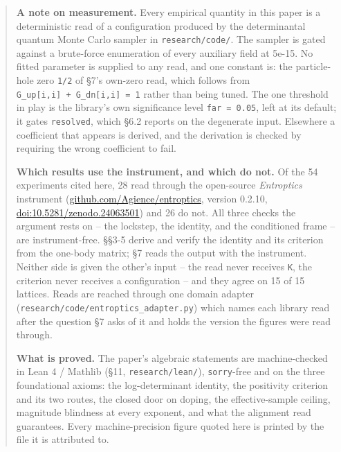 \documentclass[10pt,letterpaper,twocolumn]{article}
\begin{document}
\begin{quote}
\textbf{A note on measurement.} Every empirical quantity in this paper is a deterministic read of a
configuration produced by the determinantal quantum Monte Carlo sampler in \texttt{research/\allowbreak{}code/\allowbreak{}}. The
sampler is gated against a brute-force enumeration of every auxiliary field at 5e-15. No
fitted parameter is supplied to any read, and one constant is: the particle-hole zero \texttt{1/\allowbreak{}2} of
§7's own-zero read, which follows from \texttt{G\_\allowbreak{}up[\allowbreak{}i,\allowbreak{}i]\allowbreak{}\ +\allowbreak{}\ G\_\allowbreak{}dn[\allowbreak{}i,\allowbreak{}i]\allowbreak{}\ =\allowbreak{}\ 1} rather than being tuned. The
one threshold in play is the library's own significance level \texttt{far\ =\allowbreak{}\ 0.\allowbreak{}05}, left at its default;
it gates \texttt{resolved}, which §6.2 reports on the degenerate input. Elsewhere a coefficient
that appears is derived, and the derivation is checked by requiring the wrong coefficient to fail.

\textbf{Which results use the instrument, and which do not.} Of the 54 experiments cited here, 28 read
through the open-source \emph{Entroptics} instrument
(\href{https://github.com/Agience/entroptics}{github.\allowbreak{}com/\allowbreak{}Agience/\allowbreak{}entropti\allowbreak{}cs}, version 0.2.10,
\href{https://doi.org/10.5281/zenodo.24063501}{doi:\allowbreak{}10.\allowbreak{}5281/\allowbreak{}zenodo.\allowbreak{}24063501}) and 26 do not. All three
checks the argument rests on -- the lockstep, the identity, and the conditioned frame -- are
instrument-free. §§3-5 derive and verify the identity and its criterion from the one-body matrix;
§7 reads the output with the instrument. Neither side is given the other's input -- the read never
receives \texttt{K}, the criterion never receives a configuration -- and they agree on 15 of 15
lattices. Reads are reached through one domain adapter
(\texttt{research/\allowbreak{}code/\allowbreak{}entroptics\_\allowbreak{}adapter.\allowbreak{}py}) which names each library read after the question §7 asks
of it and holds the version the figures were read through.

\textbf{What is proved.} The paper's algebraic statements are machine-checked in Lean 4 / Mathlib
(§11, \texttt{research/\allowbreak{}lean/\allowbreak{}}), \texttt{sorry}-free and on the three foundational axioms: the log-determinant
identity, the positivity criterion and its two routes, the closed door on doping, the
effective-sample ceiling, magnitude blindness at every exponent, and what the alignment read
guarantees. Every machine-precision figure quoted here is printed by the file it is attributed to.
\end{quote}
\end{document}
